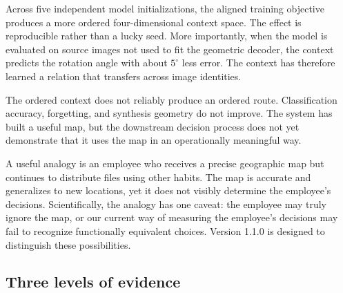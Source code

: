 \documentclass[11pt,a4paper]{article}
\begin{document}
\begin{positivebox}
Across five independent model initializations, the aligned training objective produces a more ordered four-dimensional context space. The effect is reproducible rather than a lucky seed. More importantly, when the model is evaluated on source images not used to fit the geometric decoder, the context predicts the rotation angle with about $5^\circ$ less error. The context has therefore learned a relation that transfers across image identities.
\end{positivebox}

\begin{warningbox}
The ordered context does not reliably produce an ordered route. Classification accuracy, forgetting, and synthesis geometry do not improve. The system has built a useful map, but the downstream decision process does not yet demonstrate that it uses the map in an operationally meaningful way.
\end{warningbox}

A useful analogy is an employee who receives a precise geographic map but continues to distribute files using other habits. The map is accurate and generalizes to new locations, yet it does not visibly determine the employee's decisions. Scientifically, the analogy has one caveat: the employee may truly ignore the map, or our current way of measuring the employee's decisions may fail to recognize functionally equivalent choices. Version 1.1.0 is designed to distinguish these possibilities.

\subsection{Three levels of evidence}

\begin{center}
\end{center}
\end{document}

